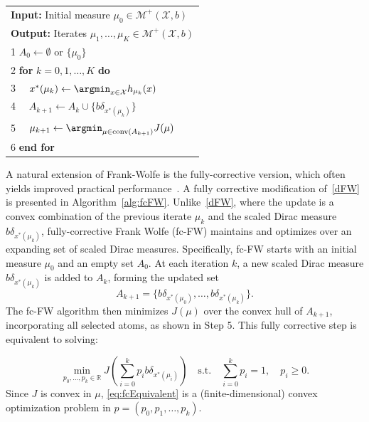 \documentclass[stsy,sglanonrev]{informs4}
\begin{document}
\begin{algorithm}
\caption{Fully-corrective Frank Wolfe (fc-FW) on $\mathcal{M}^+(\mathcal{X},b)$}\label{alg:fcFW}
\begin{tabular} {l}
  
  \textbf{Input:} Initial measure $\mu_0\in \mathcal{M}^+(\mathcal{X},b)$ \\ 
  \textbf{Output:} Iterates $\mu_1, \dots, \mu_{K}\in \mathcal{M}^+(\mathcal{X},b)$\\
  1 $A_0 \leftarrow \emptyset$ or $\{\mu_0\}$\\
  2 \textbf{for} $k=0,1,\dots, K$ \textbf{do}\\
  3 ~~$x^*(\mu_k)\leftarrow \argmin_{x\in \mathcal{X}} h_{\mu_k}(x)$\\
  4 ~~$A_{k+1}\leftarrow A_k\cup\{b\delta_{x^*(\mu_k)}\}$\\
  5 ~~$\mu_{k+1}\leftarrow \argmin_{\mu\in \mathrm{conv}(A_{k+1})} J(\mu)$\\
  6 \textbf{end for}\\
   
 \end{tabular}
\end{algorithm}

A natural extension of Frank-Wolfe is the fully-corrective version, which often yields improved practical performance~\cite{2013brepik,2017boygeorec}. A fully corrective modification of~\eqref{dFW} is presented in Algorithm~\ref{alg:fcFW}. Unlike~\eqref{dFW}, where the update is a convex combination of the previous iterate \(\mu_k\) and the scaled Dirac measure \( b \delta_{x^*(\mu_k)} \), fully-corrective Frank Wolfe (fc-FW) maintains and optimizes over an expanding set of scaled Dirac measures. Specifically, fc-FW starts with an initial measure \(\mu_0\) and an empty set \(A_0\). At each iteration \(k\), a new scaled Dirac measure \( b \delta_{x^*(\mu_k)} \) is added to \(A_k\), forming the updated set
\[
A_{k+1} = \{ b \delta_{x^*(\mu_0)}, \dots, b \delta_{x^*(\mu_k)} \}.
\]
The fc-FW algorithm then minimizes \( J(\mu) \) over the convex hull of \( A_{k+1} \), incorporating all selected atoms, as shown in Step 5. This fully corrective step is equivalent to solving:

\begin{equation}\label{eq:fcEquivalent}
\min_{p_0, \dots, p_k\in\mathbb{R}} J\left( \sum_{i=0}^{k} p_i b\delta_{x^*(\mu_i)} \right) 
\quad \text{s.t.} \quad \sum_{i=0}^{k} p_i = 1, \quad p_i \geq 0.
\end{equation}
Since \( J \) is convex in $\mu$, \eqref{eq:fcEquivalent} is a (finite-dimensional) convex optimization problem in $p = (p_0,p_1,\ldots,p_k)$.
\end{document}
